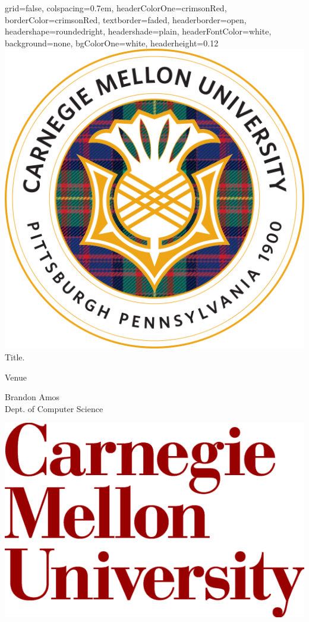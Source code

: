 \documentclass[landscape,archE,fontscale=0.3]{baposter}
\begin{document}
\begin{poster}{
    grid=false, %
    colspacing=0.7em, %
    headerColorOne=crimsonRed, borderColor=crimsonRed, %
    textborder=faded, %
    headerborder=open, headershape=roundedright,
    headershade=plain, headerFontColor=white,
    background=none, bgColorOne=white,
    headerheight=0.12\textheight
  }{
    \includegraphics[height=0.12\textheight]{cmu-seal}
  }{
    \sc\Huge Title.
  }{
    \bigskip\Large
    \begin{minipage}{0.4\textwidth}
      Venue
    \end{minipage}
    \begin{minipage}{0.4\textwidth}
      Brandon Amos \\
      Dept. of Computer Science
    \end{minipage}
  }{
    \includegraphics[height=0.12\textheight]{cmu-logo}
  }


\end{poster}
\end{document}
